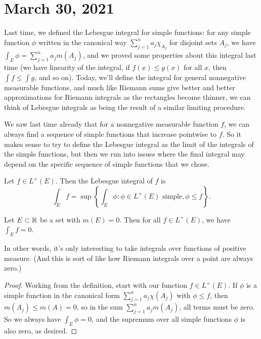 \pagebreak\section{March 30, 2021}

Last time, we defined the Lebesgue integral for simple functions: for any simple function $\phi$ written in the canonical way $\sum_{j=1}^n a_j \chi_{A_j}$ for disjoint sets $A_j$, we have $\int_E \phi = \sum_{j=1}^n a_j m(A_j)$, and we proved some properties about this integral last time (we have linearity of the integral, if $f(x) \le g(x)$ for all $x$, then $\int f \le \int g$, and so on). Today, we'll define the integral for general nonnegative measurable functions, and much like Riemann sums give better and better approximations for Riemann integrals as the rectangles become thinner, we can think of Lebesgue integrals as being the result of a similar limiting procedure.

We saw last time already that for a nonnegative measurable function $f$, we can always find a sequence of simple functions that increase pointwise to $f$. So it makes sense to try to define the Lebesgue integral as the limit of the integrals of the simple functions, but then we run into issues where the final integral may depend on the specific sequence of simple functions that we chose.

\begin{definition}
Let $f \in L^+(E)$. Then the Lebesgue integral of $f$ is
\[
    \int_E f = \sup\left\{\int_E \phi: \phi \in L^+(E) \text{ simple}, \phi \le f\right\}.
\]
\end{definition}

\begin{proposition}\label{lebesgdefn1}
Let $E \subset \mathbb R$ be a set with $m(E) = 0$. Then for all $f \in L^+(E)$, we have $\int_E f = 0$.
\end{proposition}

In other words, it's only interesting to take integrals over functions of positive measure. (And this is sort of like how Riemann integrals over a point are always zero.)

\begin{proof}
Working from the definition, start with our function $f \in L^+(E)$. If $\phi$ is a simple function in the canonical form $\sum_{j=1}^n a_j \chi(A_j)$ with $\phi \le f$, then $m(A_j) \le m(A) = 0$, so in the sum $\sum_{j=1}^n a_j m(A_j)$, all terms must be zero. So we always have $\int_E \phi = 0$, and the supremum over all simple functions $\phi$ is also zero, as desired.
\end{proof}


